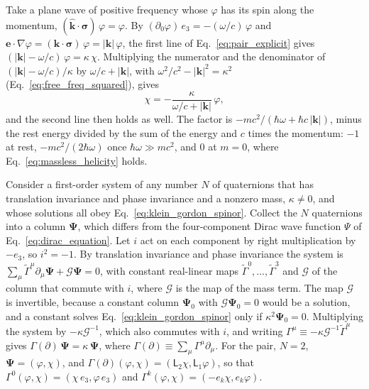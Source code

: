 \documentclass[aps,prd,onecolumn,tightenlines,nofootinbib,notitlepage,11pt,floatfix]{revtex4-2}
\theoremstyle{indentedtheorem}
\begin{document}
Take a plane wave of positive frequency whose $\varphi$ has its spin along the momentum, $(\hat{\mathbf{k}}\cdot\boldsymbol{\sigma})\,\varphi=\varphi$. By $(\partial_0\varphi)\,e_3=-(\omega/c)\,\varphi$ and $\mathbf{e}\cdot\nabla\varphi=(\mathbf{k}\cdot\boldsymbol{\sigma})\,\varphi=|\mathbf{k}|\,\varphi$, the first line of Eq.~\eqref{eq:pair_explicit} gives $(|\mathbf{k}|-\omega/c)\,\varphi=\kappa\,\chi$. Multiplying the numerator and the denominator of $(|\mathbf{k}|-\omega/c)/\kappa$ by $\omega/c+|\mathbf{k}|$, with $\omega^2/c^2-|\mathbf{k}|^2=\kappa^2$ (Eq.~\eqref{eq:free_freq_squared}), gives
\begin{equation}
    \chi = -\frac{\kappa}{\omega/c+|\mathbf{k}|} \, \varphi ,
    \label{eq:pair_ratio}
\end{equation}
and the second line then holds as well. The factor is $-mc^2/(\hbar\omega+\hbar c\,|\mathbf{k}|)$, minus the rest energy divided by the sum of the energy and $c$ times the momentum: $-1$ at rest, $-mc^2/(2\hbar\omega)$ once $\hbar\omega\gg mc^2$, and $0$ at $m=0$, where Eq.~\eqref{eq:massless_helicity} holds.

Consider a first-order system of any number $N$ of quaternions that has translation invariance and phase invariance and a nonzero mass, $\kappa\neq0$, and whose solutions all obey Eq.~\eqref{eq:klein_gordon_spinor}. Collect the $N$ quaternions into a column $\boldsymbol{\Psi}$, which differs from the four-component Dirac wave function $\Psi$ of Eq.~\eqref{eq:dirac_equation}. Let $i$ act on each component by right multiplication by $-e_3$, so $i^2=-1$. By translation invariance and phase invariance the system is $\sum_\mu\tilde{\Gamma}^\mu\partial_\mu\boldsymbol{\Psi}+\mathcal{G}\boldsymbol{\Psi}=0$, with constant real-linear maps $\tilde{\Gamma}^0,\ldots,\tilde{\Gamma}^3$ and $\mathcal{G}$ of the column that commute with $i$, where $\mathcal{G}$ is the map of the mass term. The map $\mathcal{G}$ is invertible, because a constant column $\boldsymbol{\Psi}_0$ with $\mathcal{G}\boldsymbol{\Psi}_0=0$ would be a solution, and a constant solves Eq.~\eqref{eq:klein_gordon_spinor} only if $\kappa^2\boldsymbol{\Psi}_0=0$. Multiplying the system by $-\kappa\mathcal{G}^{-1}$, which also commutes with $i$, and writing $\Gamma^\mu\equiv-\kappa\mathcal{G}^{-1}\tilde{\Gamma}^\mu$ gives $\Gamma(\partial)\,\boldsymbol{\Psi}=\kappa\,\boldsymbol{\Psi}$, where $\Gamma(\partial)\equiv\sum_\mu\Gamma^\mu\partial_\mu$. For the pair, $N=2$, $\boldsymbol{\Psi}=(\varphi,\chi)$, and $\Gamma(\partial)(\varphi,\chi)=(\mathsf{L}_2\chi,\mathsf{L}_1\varphi)$, so that $\Gamma^0(\varphi,\chi)=(\chi\,e_3,\varphi\,e_3)$ and $\Gamma^k(\varphi,\chi)=(-e_k\chi,e_k\varphi)$.
\end{document}

